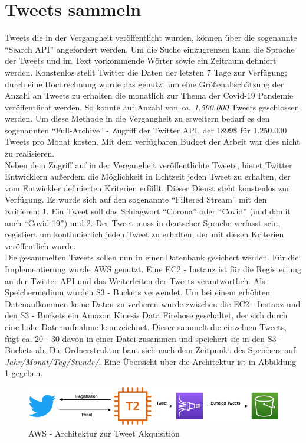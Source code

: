 \section{Tweets sammeln}
Tweets die in der Vergangheit veröffentlicht wurden, können über die sogenannte "`Search API"' angefordert werden. Um die Suche einzugrenzen kann die Sprache der Tweets und im Text vorkommende Wörter sowie ein Zeitraum definiert werden. 
Konstenlos stellt Twitter die Daten der letzten 7 Tage zur Verfügung; durch eine Hochrechnung wurde das genutzt um eine Größenabschätzung der Anzahl an Tweets zu erhalten die monatlich zur Thema der Covid-19 Pandemie veröffentlicht werden.
So konnte auf Anzahl von \textit{ca. 1.500.000} Tweets geschlossen werden. 
Um diese Methode in die Vergangheit zu erweitern bedarf es den sogenannten "`Full-Archive"' - Zugriff der Twitter API, der 1899\$ für 1.250.000 Tweets pro Monat kosten. Mit dem verfügbaren Budget der Arbeit war dies nicht zu realisieren.\\ \newline
Neben dem Zugriff auf in der Vergangheit veröffentlichte Tweets, bietet Twitter Entwicklern außerdem die Möglichkeit in Echtzeit jeden Tweet zu erhalten, der vom Entwickler definierten Kriterien erfüllt.
Dieser Dienst steht konstenlos zur Verfügung.
Es wurde sich auf den sogenannte "`Filtered Stream"' mit den Kritieren: 1. Ein Tweet soll das Schlagwort "`Corona"' oder "`Covid"' (und damit auch "`Covid-19"') und 2. Der Tweet muss in deutscher Sprache verfasst sein, registiert um kontinuierlich jeden Tweet zu erhalten, der mit diesen Kriterien veröffentlich wurde. \\
Die gesammelten Tweets sollen nun in einer Datenbank gesichert werden. 
Für die Implementierung wurde \ac{AWS}  genutzt. Eine \gls{EC2 - Instanz} ist für die Registeriung an der Twitter API und das Weiterleiten der Tweets verantwortlich. Als Speichermedium wurden \glspl{S3 - Bucket} verwendet. Um bei einem erhöhten Datenaufkommen keine Daten zu verlieren wurde zwischen die \gls{EC2 - Instanz} und den \glspl{S3 - Bucket} ein \gls{Amazon Kinesis Data Firehose} geschaltet, der sich durch eine hohe Datenaufnahme kennzeichnet. 
Dieser sammelt die einzelnen Tweets, fügt ca. 20 - 30 davon in einer Datei zusammen und speichert sie in den \glspl{S3 - Bucket} ab. 
Die Ordnerstruktur baut sich nach dem Zeitpunkt des Speichers auf: \textit{Jahr/Monat/Tag/Stunde/}.
Eine Übersicht über die Architektur ist in Abbildung \ref{fig:aws-architecture} gegeben.
\begin{figure}[h]
	\centering
	\includegraphics[width=0.7\linewidth]{images/AWS-architecture}
	\caption[]{\ac{AWS} - Architektur zur Tweet Akquisition}
	\label{fig:aws-architecture}
\end{figure}

